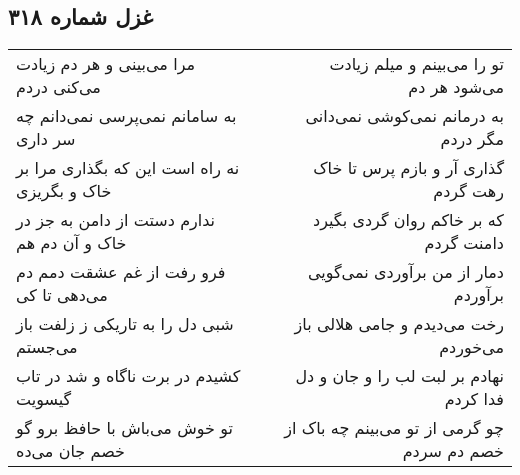 \begin{center}
\section*{غزل شماره ۳۱۸}
\label{sec:sh318}
\begin{longtable}{l p{0.5cm} r}
مرا می‌بینی و هر دم زیادت می‌کنی دردم
&&
تو را می‌بینم و میلم زیادت می‌شود هر دم
\\
به سامانم نمی‌پرسی نمی‌دانم چه سر داری
&&
به درمانم نمی‌کوشی نمی‌دانی مگر دردم
\\
نه راه است این که بگذاری مرا بر خاک و بگریزی
&&
گذاری آر و بازم پرس تا خاک رهت گردم
\\
ندارم دستت از دامن به جز در خاک و آن دم هم
&&
که بر خاکم روان گردی بگیرد دامنت گردم
\\
فرو رفت از غم عشقت دمم دم می‌دهی تا کی
&&
دمار از من برآوردی نمی‌گویی برآوردم
\\
شبی دل را به تاریکی ز زلفت باز می‌جستم
&&
رخت می‌دیدم و جامی هلالی باز می‌خوردم
\\
کشیدم در برت ناگاه و شد در تاب گیسویت
&&
نهادم بر لبت لب را و جان و دل فدا کردم
\\
تو خوش می‌باش با حافظ برو گو خصم جان می‌ده
&&
چو گرمی از تو می‌بینم چه باک از خصم دم سردم
\\
\end{longtable}
\end{center}

